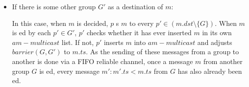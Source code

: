 \documentclass[times, 10pt]{article}
\begin{document}
\begin{itemize}
\begin{itemize}
    \item If there is some other group $G'$ as a destination of $m$:
    
    In this case, when $m$ is decided, $p$ \rmcast{}s $m$ to every \mbox{$p' \in (m.dst \setminus \{G\})$}. When $m$ is \rmdel{}ed by each $p' \in G'$, $p'$ checks whether it has ever inserted $m$ in its own $am-multicast$ list. If not, $p'$ inserts $m$ into $am-multicast$ and adjusts $barrier(G, G')$ to $m.ts$. As the sending of these messages from a group to another is done via a FIFO reliable channel, once a message $m$ from another group $G$ is \rmdel{}ed, every message $m' : m'.ts < m.ts$ from $G$ has also already been \rmdel{}ed.
    
  \end{itemize}
%   
% 
%   

\end{itemize}
\end{document}
